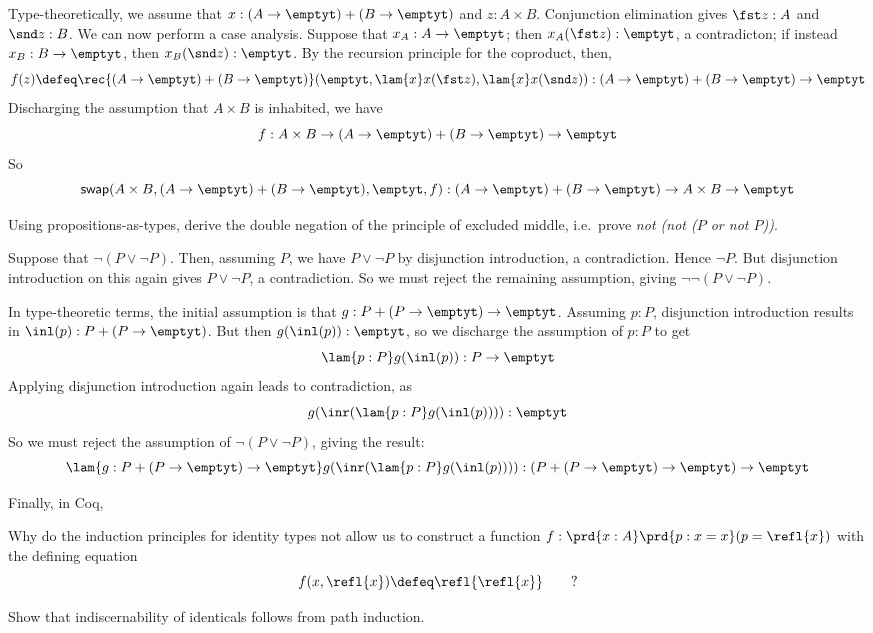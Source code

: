 Type-theoretically, we assume that $x : (A \to\emptyt) + (B \to\emptyt)$ and $z
: A \times B$.  Conjunction elimination gives $\fst z : A$ and $\snd z : B$.
We can now perform a case analysis.  Suppose that $x_{A} : A \to \emptyt$; then
$x_{A}(\fst z) : \emptyt$, a contradicton; if instead $x_{B} : B \to \emptyt$,
then $x_{B}(\snd z) : \emptyt$.  By the recursion principle for the coproduct,
then,
\[
  f(z) \defeq \rec{(A\to\emptyt)+(B\to\emptyt)}(
    \emptyt,
    \lam{x}x(\fst z),
    \lam{x}x(\snd z)
  )
  :
  (A \to \emptyt) + (B \to \emptyt) \to \emptyt
\]
Discharging the assumption that $A \times B$ is inhabited, we have
\[
  f : 
  A \times B \to (A \to \emptyt) + (B \to \emptyt) \to \emptyt
\]
So
\[
  \mathsf{swap}(A\times B, (A\to\emptyt)+(B\to\emptyt), \emptyt, f)
  :
  (A \to \emptyt) + (B \to \emptyt) 
  \to 
  A \times B 
  \to \emptyt
\]



  Using propositions-as-types, derive the double negation of the
principle of excluded middle, i.e.~prove \emph{not (not ($P$ or not $P$))}.

\soln  Suppose that $\lnot(P \lor \lnot P)$.  Then, assuming $P$, we have
$P \lor \lnot P$ by disjunction introduction, a contradiction.  Hence
$\lnot P$.  But disjunction introduction on this again gives $P \lor \lnot P$,
a contradiction.  So we must reject the remaining assumption, giving
$\lnot\lnot(P \lor \lnot P)$.

In type-theoretic terms, the initial assumption is that $g : P + (P \to
\emptyt) \to \emptyt$.  Assuming $p : P$, disjunction introduction results in
$\inl(p) : P + (P \to \emptyt)$.  But then $g(\inl(p)) : \emptyt$, so we
discharge the assumption of $p : P$ to get
\[
  \lam{p:P}g(\inl(p)) : P \to \emptyt
\]
Applying disjunction introduction again leads to contradiction, as
\[
  g(\inr(\lam{p:P}g(\inl(p)))) : \emptyt
\]
So we must reject the assumption of $\lnot( P \lor \lnot P)$, giving the
result:
\[
  \lam{g:P + (P \to \emptyt) \to \emptyt}g(\inr(\lam{p:P}g(\inl(p)))) 
  : 
  (P + (P \to \emptyt) \to \emptyt) \to \emptyt
\]

Finally, in Coq,


  Why do the induction principles for identity types not allow
us to construct a function $f : \prd{x:A}\prd{p:x=x}(p = \refl{x})$ with the
defining equation
\[
  f(x, \refl{x}) \defeq \refl{\refl{x}}\qquad?
\]

 Show that indiscernability of identicals follows from path
induction.

\nwenddocs{}
